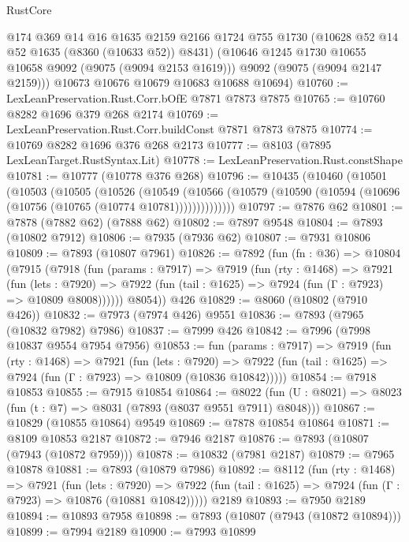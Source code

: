 \begin{lexlean}{RustCore}
\begin{coremodule}
        @174
        @369
        @14
        @16
        @1635
        @2159
        @2166
        @1724
        @755
        @1730
        (@10628 @52 @14 @52 @1635 (@8360 (@10633 @52)) @8431)
        (@10646 @1245 @1730 @10655 @10658 @9092 (@9075 (@9094 @2153 @1619)))
        @9092
        (@9075 (@9094 @2147 @2159)))
      @10673
      @10676
      @10679
      @10683
      @10688
      @10694)
@10760 := LexLeanPreservation.Rust.Corr.bOfE @7871 @7873 @7875
@10765 := @10760 @8282 @1696 @379 @268 @2174
@10769 := LexLeanPreservation.Rust.Corr.buildConst @7871 @7873 @7875
@10774 := @10769 @8282 @1696 @376 @268 @2173
@10777 := @8103 (@7895 LexLeanTarget.RustSyntax.Lit)
@10778 := LexLeanPreservation.Rust.constShape
@10781 := @10777 (@10778 @376 @268)
@10796 := @10435
    (@10460
      (@10501
        (@10503
          (@10505
            (@10526
              (@10549
                (@10566 (@10579 (@10590 (@10594 (@10696 (@10756 (@10765 (@10774 @10781))))))))))))))
@10797 := @7876 @62
@10801 := @7878 (@7882 @62) (@7888 @62)
@10802 := @7897 @9548
@10804 := @7893 (@10802 @7912)
@10806 := @7935 (@7936 @62)
@10807 := @7931 @10806
@10809 := @7893 (@10807 @7961)
@10826 := @7892
    (fun (fn : @36) =>
    @10804
      (@7915
        (@7918
          (fun (params : @7917) =>
          @7919
            (fun (rty : @1468) =>
            @7921
              (fun (lets : @7920) =>
              @7922 (fun (tail : @1625) => @7924 (fun (Γ : @7923) => @10809 @8008))))))
        @8054))
    @426
@10829 := @8060 (@10802 (@7910 @426))
@10832 := @7973 (@7974 @426) @9551
@10836 := @7893 (@7965 (@10832 @7982) @7986)
@10837 := @7999 @426
@10842 := @7996 (@7998 @10837 @9554 @7954 @7956)
@10853 := fun (params : @7917) =>
  @7919
    (fun (rty : @1468) =>
    @7921
      (fun (lets : @7920) =>
      @7922 (fun (tail : @1625) => @7924 (fun (Γ : @7923) => @10809 (@10836 @10842)))))
@10854 := @7918 @10853
@10855 := @7915 @10854
@10864 := @8022 (fun (U : @8021) => @8023 (fun (t : @7) => @8031 (@7893 (@8037 @9551 @7911) @8048)))
@10867 := @10829 (@10855 @10864) @9549
@10869 := @7878 @10854 @10864
@10871 := @8109 @10853 @2187
@10872 := @7946 @2187
@10876 := @7893 (@10807 (@7943 (@10872 @7959)))
@10878 := @10832 (@7981 @2187)
@10879 := @7965 @10878
@10881 := @7893 (@10879 @7986)
@10892 := @8112
    (fun (rty : @1468) =>
    @7921
      (fun (lets : @7920) =>
      @7922 (fun (tail : @1625) => @7924 (fun (Γ : @7923) => @10876 (@10881 @10842)))))
    @2189
@10893 := @7950 @2189
@10894 := @10893 @7958
@10898 := @7893 (@10807 (@7943 (@10872 @10894)))
@10899 := @7994 @2189
@10900 := @7993 @10899

\end{coremodule}
\end{lexlean}
